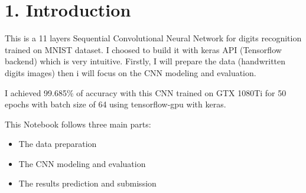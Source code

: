 \documentclass[11pt]{article}
\providecommand{\tightlist}{%
      \setlength{\itemsep}{0pt}\setlength{\parskip}{0pt}}
\begin{document}
    \hypertarget{introduction}{%
\section{1. Introduction}\label{introduction}}

This is a 11 layers Sequential Convolutional Neural Network for digits
recognition trained on MNIST dataset. I choosed to build it with keras
API (Tensorflow backend) which is very intuitive. Firstly, I will
prepare the data (handwritten digits images) then i will focus on the
CNN modeling and evaluation.

I achieved 99.685\% of accuracy with this CNN trained on GTX 1080Ti for
50 epochs with batch size of 64 using tensorflow-gpu with keras.

This Notebook follows three main parts:

\begin{itemize}
\tightlist
\item
  The data preparation
\item
  The CNN modeling and evaluation
\item
  The results prediction and submission
\end{itemize}
\end{document}
